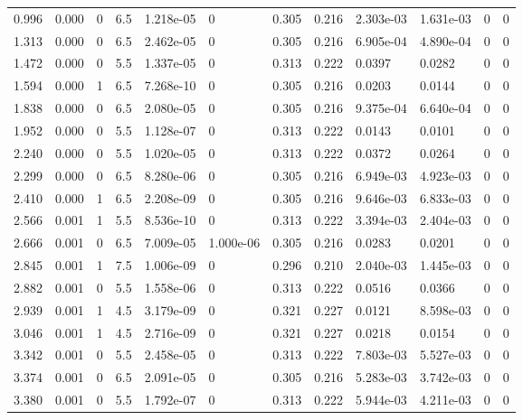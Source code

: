 \documentclass[preview]{standalone}
\begin{document}
{{\begin{tabular}{L{1.2cm}C{1.2cm} C{0.3cm}C{0.5cm} C{1.4cm}C{1.4cm} C{1.4cm}C{1.4cm} C{1.6cm}C{1.6cm} C{1.6cm}C{1.6cm}}
  0.996  &  0.000  & 0     & 6.5 &  1.218e-05  & 0  &  0.305&   0.216& 2.303e-03 & 1.631e-03   &  0 & 0  \\ 
  1.313  &  0.000  & 0     & 6.5 &  2.462e-05  & 0  &  0.305&   0.216& 6.905e-04 & 4.890e-04   &  0 & 0  \\ 
  1.472  &  0.000  & 0     & 5.5 &  1.337e-05  & 0  &  0.313&   0.222& 0.0397 & 0.0282   &  0 & 0  \\ 
  1.594  &  0.000  & 1     & 6.5 &  7.268e-10  & 0  &  0.305&   0.216& 0.0203 & 0.0144   &  0 & 0  \\ 
  1.838  &  0.000  & 0     & 6.5 &  2.080e-05  & 0  &  0.305&   0.216& 9.375e-04 & 6.640e-04   &  0 & 0  \\ 
  1.952  &  0.000  & 0     & 5.5 &  1.128e-07  & 0  &  0.313&   0.222& 0.0143 & 0.0101   &  0 & 0  \\ 
  2.240  &  0.000  & 0     & 5.5 &  1.020e-05  & 0  &  0.313&   0.222& 0.0372 & 0.0264   &  0 & 0  \\ 
  2.299  &  0.000  & 0     & 6.5 &  8.280e-06  & 0  &  0.305&   0.216& 6.949e-03 & 4.923e-03   &  0 & 0  \\ 
  2.410  &  0.000  & 1     & 6.5 &  2.208e-09  & 0  &  0.305&   0.216& 9.646e-03 & 6.833e-03   &  0 & 0  \\ 
  2.566  &  0.001  & 1     & 5.5 &  8.536e-10  & 0  &  0.313&   0.222& 3.394e-03 & 2.404e-03   &  0 & 0  \\ 
  2.666  &  0.001  & 0     & 6.5 &  7.009e-05  & 1.000e-06  &  0.305&   0.216& 0.0283 & 0.0201   &  0 & 0  \\ 
  2.845  &  0.001  & 1     & 7.5 &  1.006e-09  & 0  &  0.296&   0.210& 2.040e-03 & 1.445e-03   &  0 & 0  \\ 
  2.882  &  0.001  & 0     & 5.5 &  1.558e-06  & 0  &  0.313&   0.222& 0.0516 & 0.0366   &  0 & 0  \\ 
  2.939  &  0.001  & 1     & 4.5 &  3.179e-09  & 0  &  0.321&   0.227& 0.0121 & 8.598e-03   &  0 & 0  \\ 
  3.046  &  0.001  & 1     & 4.5 &  2.716e-09  & 0  &  0.321&   0.227& 0.0218 & 0.0154   &  0 & 0  \\ 
  3.342  &  0.001  & 0     & 5.5 &  2.458e-05  & 0  &  0.313&   0.222& 7.803e-03 & 5.527e-03   &  0 & 0  \\ 
  3.374  &  0.001  & 0     & 6.5 &  2.091e-05  & 0  &  0.305&   0.216& 5.283e-03 & 3.742e-03   &  0 & 0  \\ 
  3.380  &  0.001  & 0     & 5.5 &  1.792e-07  & 0  &  0.313&   0.222& 5.944e-03 & 4.211e-03   &  0 & 0  \\ 

\end{tabular}}}
\end{document}
